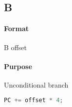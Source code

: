 \subsection{B}


\paragraph{Format} B offset

\paragraph{Purpose} Unconditional branch

\begin{lstlisting}[language=c]
    PC += offset * 4;
\end{lstlisting}
